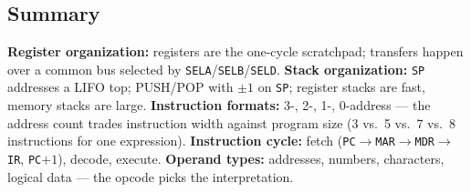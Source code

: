 \documentclass[11pt]{article}
\begin{document}
\subsection{Summary}

\textbf{Register organization:} registers are the one-cycle scratchpad; transfers happen over a common bus selected by \texttt{SELA}/\texttt{SELB}/\texttt{SELD}. \textbf{Stack organization:} \texttt{SP} addresses a LIFO top; PUSH/POP with $\pm 1$ on \texttt{SP}; register stacks are fast, memory stacks are large. \textbf{Instruction formats:} 3-, 2-, 1-, 0-address --- the address count trades instruction width against program size (3 vs.\ 5 vs.\ 7 vs.\ 8 instructions for one expression). \textbf{Instruction cycle:} fetch (\texttt{PC}$\to$\texttt{MAR}$\to$\texttt{MDR}$\to$\texttt{IR}, \texttt{PC}${+}1$), decode, execute. \textbf{Operand types:} addresses, numbers, characters, logical data --- the opcode picks the interpretation.



\end{document}
